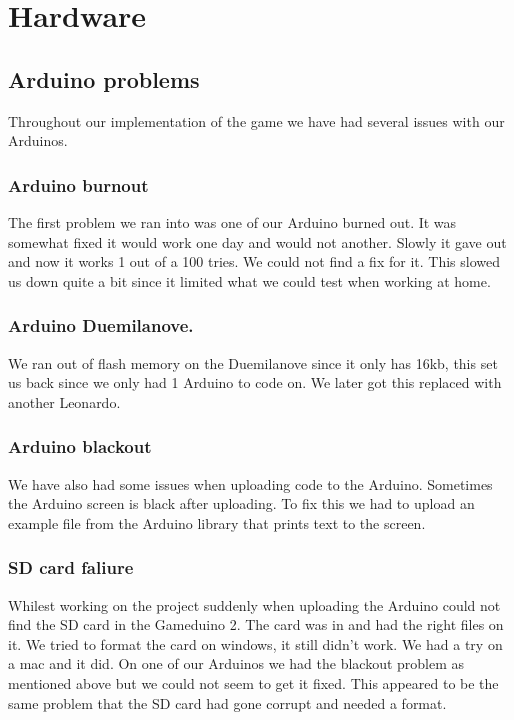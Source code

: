 \section{Hardware}

\subsection*{Arduino problems}
Throughout our implementation of the game we have had several issues with our Arduinos.

\subsubsection*{Arduino burnout}
The first problem we ran into was one of our Arduino burned out. It was somewhat fixed it would work one day and would not another. Slowly it gave out and now it works 1 out of a 100 tries. We could not find a fix for it. This slowed us down quite a bit since it limited what we could test when working at home.

\subsubsection*{Arduino Duemilanove.}
We ran out of flash memory on the Duemilanove since it only has 16kb, this set us back since we only had 1 Arduino to code on. We later got this replaced with another Leonardo.

\subsubsection*{Arduino blackout}
We have also had some issues when uploading code to the Arduino. Sometimes the Arduino screen is black after uploading. To fix this we had to upload an example file from the Arduino library that prints text to the screen.

\subsubsection*{SD card faliure}
Whilest working on the project suddenly when uploading the Arduino could not find the SD card in the Gameduino 2. The card was in and had the right files on it. We tried to format the card on windows, it still didn't work. We had a try on a mac and it did. On one of our Arduinos we had the blackout problem as mentioned above but we could not seem to get it fixed. This appeared to be the same problem that the SD card had gone corrupt and needed a format.
